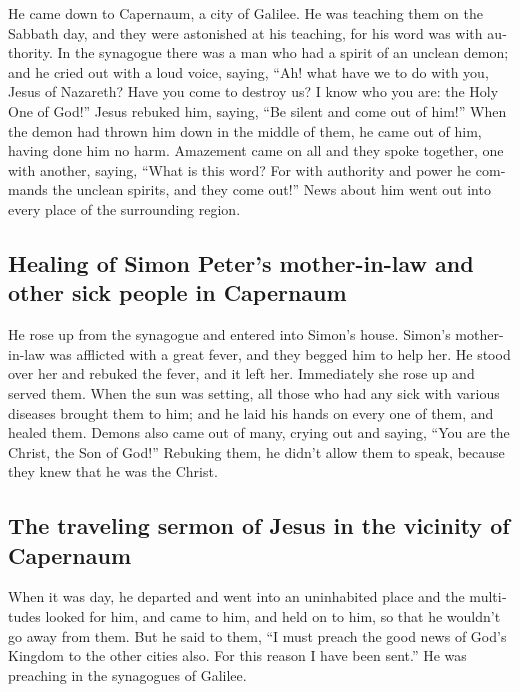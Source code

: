 \begin{paracol}{2}
\begin{otherlanguage}{english}
 He came down to Capernaum, a city of Galilee. He was
teaching them on the Sabbath day,  and they were
astonished at his teaching, for his word was with authority.
 In the synagogue there was a man who had a spirit of an
unclean demon; and he cried out with a loud voice, 
saying, ``Ah! what have we to do with you, Jesus of Nazareth? Have you
come to destroy us? I know who you are: the Holy One of God!''
 Jesus rebuked him, saying, ``Be silent and come out of
him!'' When the demon had thrown him down in the middle of them, he came
out of him, having done him no harm.  Amazement came on
all and they spoke together, one with another, saying, ``What is this
word? For with authority and power he commands the unclean spirits, and
they come out!''  News about him went out into every
place of the surrounding region.

\hypertarget{healing-of-simon-peters-mother-in-law-and-other-sick-people-in-capernaum}{%
\subsection{Healing of Simon Peter's mother-in-law and other sick people
in
Capernaum}\label{healing-of-simon-peters-mother-in-law-and-other-sick-people-in-capernaum}}

 He rose up from the synagogue and entered into Simon's
house. Simon's mother-in-law was afflicted with a great fever, and they
begged him to help her.  He stood over her and rebuked
the fever, and it left her. Immediately she rose up and served them.
 When the sun was setting, all those who had any sick
with various diseases brought them to him; and he laid his hands on
every one of them, and healed them.  Demons also came out
of many, crying out and saying, ``You are the Christ, the Son of God!''
Rebuking them, he didn't allow them to speak, because they knew that he
was the Christ.

\hypertarget{the-traveling-sermon-of-jesus-in-the-vicinity-of-capernaum}{%
\subsection{The traveling sermon of Jesus in the vicinity of
Capernaum}\label{the-traveling-sermon-of-jesus-in-the-vicinity-of-capernaum}}

 When it was day, he departed and went into an
uninhabited place and the multitudes looked for him, and came to him,
and held on to him, so that he wouldn't go away from them.
 But he said to them, ``I must preach the good news of
God's Kingdom to the other cities also. For this reason I have been
sent.''  He was preaching in the synagogues of Galilee.


\end{otherlanguage}
\end{paracol}
